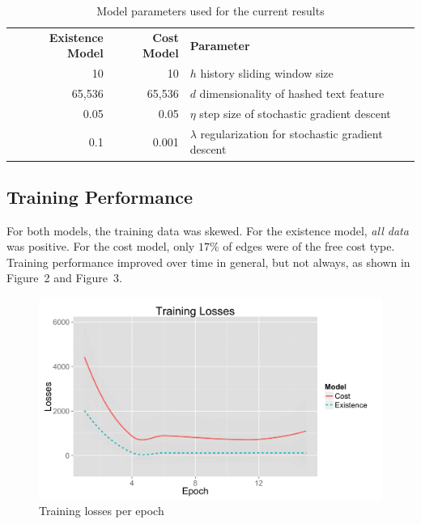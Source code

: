 \documentclass{article} %
\begin{document}
\begin{table}
\begin{tabular}{rrl} 
\textbf{Existence Model} & \textbf{Cost Model} & \textbf{Parameter} \\
10 & 10 & $h$ history sliding window size\\
65,536 & 65,536 & $d$ dimensionality of hashed text feature\\
0.05 & 0.05 & $\eta$ step size of stochastic gradient descent\\
0.1 & 0.001 & $\lambda$ regularization for stochastic gradient descent\\
\end{tabular}
\caption{Model parameters used for the current results}
\end{table}

\subsection{Training Performance}

For both models, the training data was skewed. For the existence model,
\emph{all data} was positive.  For the cost model, only $17\%$ of edges were of
the free cost type.  Training performance improved over time in general, but
not always, as shown in Figure~2 and Figure~3.

\begin{figure}
  \begin{center}
    \includegraphics[scale=.1]{trainingLosses.png}
  \end{center}
  \caption{Training losses per epoch}
\end{figure}
\end{document}
